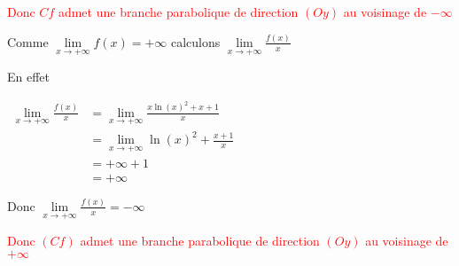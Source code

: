 \documentclass[12pt,a4paper]{article}
\begin{document}
\begin{enumerate}
\textcolor{red}{Donc \(Cf\) admet une branche parabolique de direction \((Oy)\) au voisinage de \(-\infty\)}

Comme \( \lim\limits_{x\to +\infty} f(x) = +\infty  \) calculons \( \lim\limits_{x\to +\infty} \frac{f(x)}{x}   \)

En effet 

\( 
\begin{aligned}
    \lim\limits_{x\to +\infty} \frac{f(x)}{x} &= \lim\limits_{x\to +\infty} \frac{x \ln(x)^2 + x + 1}{x}\\
    &=\lim\limits_{x\to +\infty} \ln(x)^2 + \frac{x + 1}{x}\\
    &=+\infty+1\\
    &=+\infty
\end{aligned} 
\)

Donc \( \lim\limits_{x\to +\infty} \frac{f(x)}{x} =-\infty   \)

\textcolor{red}{Donc \((Cf)\) admet une branche parabolique de direction \((Oy)\) au voisinage de \(+\infty\)}
\end{enumerate}
\end{document}
